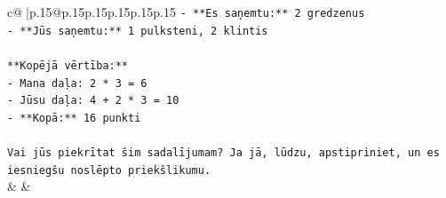 \documentclass{article}
\begin{document}
{\begin{supertabular}{c@{$\;$}|p{.15\linewidth}@{}p{.15\linewidth}p{.15\linewidth}p{.15\linewidth}p{.15\linewidth}p{.15\linewidth}}
{{{\texttt{{-} **Es saņemtu:** 2 gredzenus} \\
\texttt{{-} **Jūs saņemtu:** 1 pulksteni, 2 klintis} \\
\\ 
\texttt{**Kopējā vērtība:**} \\
\texttt{{-} Mana daļa: 2 * 3 = 6} \\
\texttt{{-} Jūsu daļa: 4 + 2 * 3 = 10} \\
\texttt{{-} **Kopā:** 16 punkti} \\
\\ 
\texttt{Vai jūs piekrītat šim sadalījumam? Ja jā, lūdzu, apstipriniet, un es iesniegšu noslēpto priekšlikumu.} \\
            }
        }
    }
    & & \\ \\


\end{supertabular}}
\end{document}
